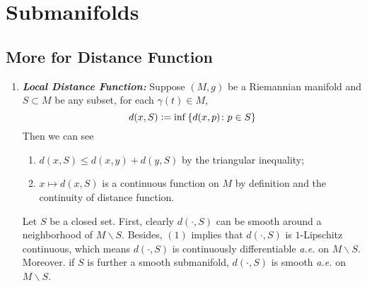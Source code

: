 \chapter{Submanifolds}

\section{More for Distance Function}

\begin{enumerate}[label=\arabic{*}.]
	\item \emph{\textbf{Local Distance Function:}}	Suppose $(M,g)$ be a Riemannian manifold and $S \subset M$ be any subset, for each $\gamma(t) \in M$,
	\begin{equation*}
		d(x,S) \vcentcolon= \inf\left\{d(x,p) \colon p \in S\right\}
	\end{equation*}
	Then we can see
	\begin{enumerate}[label=(\arabic{*})]
		\item $d(x,S) \leq d(x,y) + d(y,S)$ by the triangular inequality;
		\item $x \mapsto d(x,S)$ is a continuous function on $M$ by definition and the continuity of distance function.
	\end{enumerate}
	\begin{rmk}
	    Let $S$ be a closed set. First, clearly $d(\cdot,S)$ can be smooth around a neighborhood of $M \backslash S$. Besides, $(1)$ implies that $d(\cdot,S)$ is $1$-Lipschitz continuous, which means $d(\cdot,S)$ is continuously differentiable \emph{a.e.} on $M \backslash S$. Moreover. if $S$ is further a smooth submanifold, $d(\cdot,S)$ is smooth \emph{a.e.} on $M \backslash S$.
	\end{rmk}


\end{enumerate}
